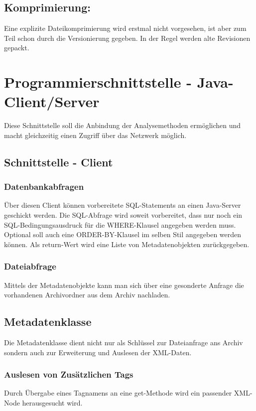 \subsection{Komprimierung:} \label{spec:req:archive:comp}
	Eine explizite Dateikomprimierung wird erstmal nicht vorgesehen, ist aber zum Teil schon durch die Versionierung gegeben.
	In der Regel werden alte Revisionen gepackt.

\section{Programmierschnittstelle - Java-Client/Server}\label{spec:req:jcs}
	Diese Schnittstelle soll die Anbindung der Analysemethoden ermöglichen und macht gleichzeitig einen Zugriff über das Netzwerk möglich.
\subsection{Schnittstelle - Client}\label{spec:req:jcs:client}
	\subsubsection{Datenbankabfragen} \label{spec:req:jcs:client:dbquery}
		Über diesen Client können vorbereitete SQL-Statements an einen Java-Server geschickt werden. 
		Die SQL-Abfrage wird soweit vorbereitet, dass nur noch ein SQL-Bedingungsausdruck für die WHERE-Klausel angegeben werden muss.
		Optional soll auch eine ORDER-BY-Klausel im selben Stil angegeben werden können. 
		Als return-Wert wird eine Liste von Metadatenobjekten zurückgegeben.
	\subsubsection{Dateiabfrage} \label{spec:req:jcs:client:fsquery}
		Mittels der Metadatenobjekte kann man sich über eine gesonderte Anfrage die vorhandenen Archivordner aus dem Archiv nachladen.
\subsection{Metadatenklasse} \label{spec:req:jcs:meta}
	Die Metadatenklasse dient nicht nur als Schlüssel zur Dateianfrage ans Archiv sondern auch zur Erweiterung und Auslesen der XML-Daten.
	\subsubsection{Auslesen von Zusätzlichen Tags} \label{spec:req:jcs:meta:select}
		Durch Übergabe eines Tagnamens an eine get-Methode wird ein passender XML-Node herausgesucht wird.
